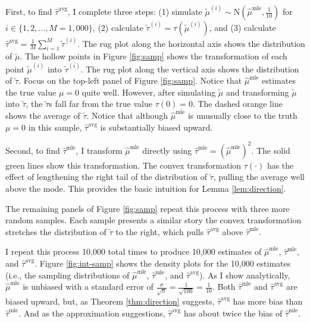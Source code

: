 \documentclass[12pt]{article}
\begin{document}
First, to find $\hat{\tau}^\text{avg}$, I complete three steps: (1) simulate $\tilde{\mu}^{(i)} \sim \text{N} \left( \hat{\mu}^\text{mle}, \frac{1}{10{}} \right)$ for $i \in \{1, 2,\ldots, M = 1,000\}$, (2) calculate $\tilde{\tau}^{(i)} = \tau\left( \tilde{\mu}^{(i)} \right)$, and (3) calculate $\hat{\tau}^\text{avg} = \frac{1}{M} \sum_{i = 1}^M \tilde{\tau}^{(i)}$. The rug plot along the horizontal axis shows the distribution of $\tilde{\mu}$. The hollow points in Figure \ref{fig:samp} shows the transformation of each point $\tilde{\mu}^{(i)}$ into $\tilde{\tau}^{(i)}$. The rug plot along the vertical axis shows the distribution of $\tilde{\tau}$.
Focus on the top-left panel of Figure \ref{fig:samp}. Notice that $\hat{\mu}^\text{mle}$ estimates the true value $\mu = 0$ quite well. However, after simulating $\tilde{\mu}$ and transforming $\tilde{\mu}$ into $\tilde{\tau}$, the $\tilde{\tau}$s fall far from the true value $\tau(0) = 0$. The dashed orange line shows the average of $\tilde{\tau}$. Notice that although $\hat{\mu}^\text{mle}$ is unusually close to the truth $\mu = 0$ in this sample, $\hat{\tau}^\text{avg}$ is substantially biased upward.

Second, to find $\hat{\tau}^\text{mle}$, I transform $\hat{\mu}^\text{mle}$ directly using $\hat{\tau}^\text{mle} = \left( \hat{\mu}^\text{mle} \right) ^2$.
The solid green lines show this transformation.
The convex transformation $\tau(\cdot)$ has the effect of lengthening the right tail of the distribution of $\tilde{\tau}$, pulling the average well above the mode.
This provides the basic intuition for Lemma \ref{lem:direction}.

The remaining panels of Figure \ref{fig:samp} repeat this process with three more random samples.
Each sample presents a similar story \textemdash{} the convex transformation stretches the distribution of $\tilde{\tau}$ to the right, which pulls $\hat{\tau}^\text{avg}$ above $\hat{\tau}^\text{mle}$.

I repeat this process 10,000 total times to produce 10,000 estimates of $\hat{\mu}^\text{mle}$, $\hat{\tau}^\text{mle}$, and $\hat{\tau}^\text{avg}$.
Figure \ref{fig:int-samp} shows the density plots for the 10,000 estimates (i.e., the sampling distributions of $\hat{\mu}^\text{mle}$, $\hat{\tau}^\text{mle}$, and $\hat{\tau}^\text{avg}$).
As I show analytically, $\hat{\mu}^\text{mle}$ is unbiased with a standard error of $\frac{\sigma}{\sqrt{n}} = \frac{1}{\sqrt{100}} = \frac{1}{10}$.
Both $\hat{\tau}^\text{mle}$ and $\hat{\tau}^\text{avg}$ are biased upward, but, as Theorem \ref{thm:direction} suggests, $\hat{\tau}^\text{avg}$ has more bias than $\hat{\tau}^\text{mle}$. And as the approximation suggestions, $\hat{\tau}^\text{avg}$ has about twice the bias of $\hat{\tau}^\text{mle}$.
\end{document}

